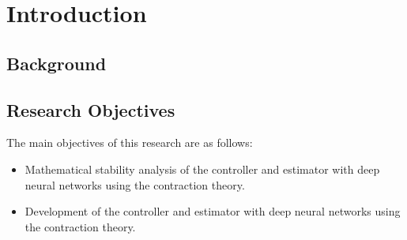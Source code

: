

\section{Introduction}\label{chap:introduction}

\subsection{Background}

\subsection{Research Objectives}

The main objectives of this research are as follows:
\begin{itemize}
    \item Mathematical stability analysis of the controller and estimator with deep neural networks using the contraction theory.
    \item Development of the controller and estimator with deep neural networks using the contraction theory.
\end{itemize}